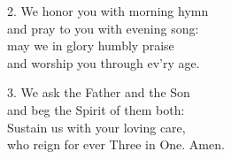 
2. We honor you with morning hymn\\
and pray to you with evening song:\\
may we in glory humbly praise\\
and worship you through ev’ry age.

3. We ask the Father and the Son\\
and beg the Spirit of them both:\\
Sustain us with your loving care,\\
who reign for ever Three in One. Amen.